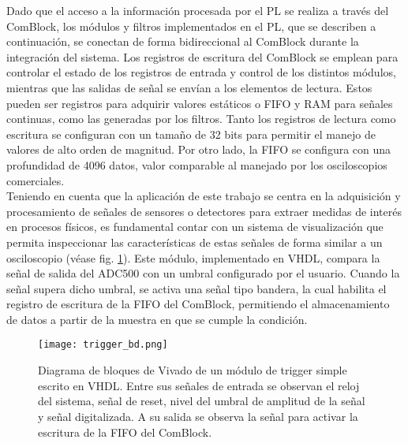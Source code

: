\documentclass{report}
\begin{document}
\noindent Dado que el acceso a la información procesada por el PL se realiza a través del ComBlock, los módulos y filtros implementados en el PL, que se describen a continuación, se conectan de forma bidireccional al ComBlock durante la integración del sistema. Los registros de escritura del ComBlock se emplean para controlar el estado de los registros de entrada y control de los distintos módulos, mientras que las salidas de señal se envían a los elementos de lectura. Estos pueden ser registros para adquirir valores estáticos o FIFO y RAM para señales continuas, como las generadas por los filtros. Tanto los registros de lectura como escritura se configuran con un tamaño de 32 bits para permitir el manejo de valores de alto orden de magnitud. Por otro lado, la FIFO se configura con una profundidad de 4096 datos, valor comparable al manejado por los osciloscopios comerciales.\\

\noindent Teniendo en cuenta que la aplicación de este trabajo se centra en la adquisición y procesamiento de señales de sensores o detectores para extraer medidas de interés en procesos físicos, es fundamental contar con un sistema de visualización que permita inspeccionar las características de estas señales de forma similar a un osciloscopio (véase fig. \ref{fig:trigger_bd}). Este módulo, implementado en VHDL, compara la señal de salida del ADC500 con un umbral configurado por el usuario. Cuando la señal supera dicho umbral, se activa una señal tipo bandera, la cual habilita el registro de escritura de la FIFO del ComBlock, permitiendo el almacenamiento de datos a partir de la muestra en que se cumple la condición.

\begin{figure}[H]
    \centering
    \texttt{[image: trigger\_bd.png]}
    \caption{Diagrama de bloques de Vivado de un módulo de trigger simple escrito en VHDL. Entre sus señales de entrada se observan el reloj del sistema, señal de reset, nivel del umbral de amplitud de la señal y señal digitalizada. A su salida se observa la señal para activar la escritura de la FIFO del ComBlock.}
    \label{fig:trigger_bd}
\end{figure}
\end{document}
